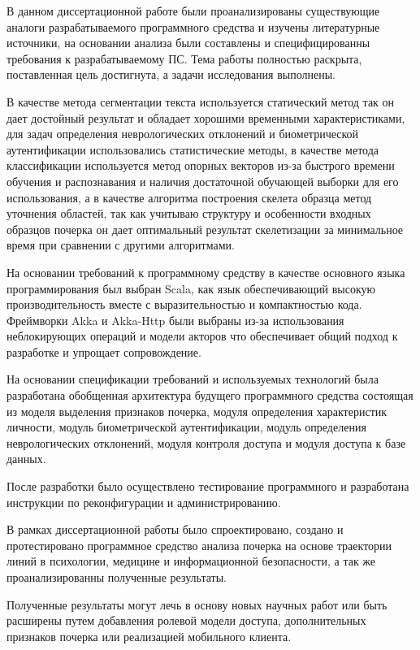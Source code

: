 \label{sec:outro}

В данном диссертационной работе были проанализированы существующие аналоги разрабатываемого программного средства и изучены литературные источники, на основании анализа были составлены и специфицированны требования к разрабатываемому ПС. Тема работы полностью раскрыта, поставленная цель достигнута, а задачи исследования выполнены.

В качестве метода сегментации текста используется статический метод так он дает достойный результат и обладает хорошими временными характеристиками, для задач определения неврологических отклонений и биометрической аутентификации использовались статистические методы, в качестве метода классификации используется метод опорных векторов из-за быстрого времени обучения и распознавания и наличия достаточной обучающей выборки для его использования, а в качестве алгоритма построения скелета образца метод уточнения областей, так как учитываю структуру и особенности входных образцов почерка он дает оптимальный результат скелетизации за минимальное время при сравнении с другими алгоритмами.

На основании требований к программному средству в качестве основного языка программирования был выбран Scala, как язык обеспечивающий высокую производительность вместе с выразительностью и компактностью кода. Фреймворки Akka и Akka-Http были выбраны из-за использования неблокирующих операций и модели акторов что обеспечивает общий подход к разработке и упрощает сопровождение.

На основании спецификации требований и используемых технологий была разработана обобщенная архитектура будущего программного средства состоящая из моделя выделения признаков почерка, модуля определения характеристик личности, модуль биометрической аутентификации, модуль определения неврологических отклонений, модуля контроля доступа и модуля доступа к базе данных.

После разработки было осуществлено тестирование программного и разработана инструкции по реконфигурации и администрированию.

В рамках диссертационной работы было спроектировано, создано и протестировано программное средство анализа почерка на основе траектории линий в психологии, медицине и информационной безопасности, а так же проанализированны полученные результаты. 

Полученные результаты могут лечь в основу новых научных работ или быть расширены путем добавления ролевой модели доступа, дополнительных признаков почерка или реализацией мобильного клиента.